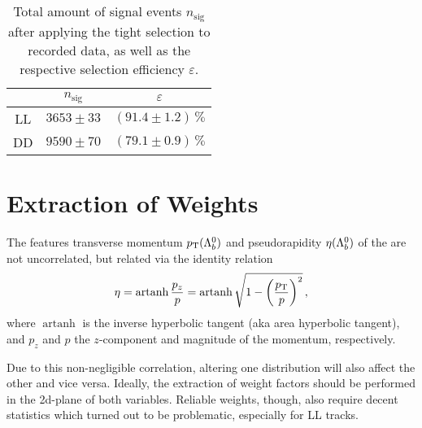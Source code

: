 \begin{table}[htbp]
    \centering
    \caption{Total amount of signal events $n_\text{sig}$ after applying the tight selection to recorded \decay{\Lb}{\jpsi\Lz} data, as well as the respective selection efficiency $\varepsilon$.}
    \label{tab:LbToJpsiLz_tighsel_eff}
    \begin{tabular}{ccc}
        \toprule
        & $n_\text{sig}$ & $\varepsilon$ \\
        \midrule
        \gls{LL} & $\num{3653} \pm 33$ & $(91.4 \pm 1.2) \,\%$ \\
        \gls{DD} & $\num{9590} \pm 70$ & $(79.1 \pm 0.9) \,\%$ \\
        \bottomrule
    \end{tabular}
\end{table}

\section{Extraction of Weights}
The features transverse momentum $\mbox{$p_{\mathrm{ T}}$}({{\Lambda}^0_{b}})$ and pseudorapidity $\eta({{\Lambda}^0_{b}})$ of the \Lb are not uncorrelated, but related via the identity relation
\begin{equation*}
    \eta = \operatorname{artanh} \frac{p_z}{p} = \operatorname{artanh} \sqrt{1 - \left( \frac{\mbox{$p_{\mathrm{ T}}$}}{p} \right)^2} \,,
\end{equation*}
where $\operatorname{artanh}$ is the inverse hyperbolic tangent (aka area hyperbolic tangent), and $p_z$ and $p$ the $z$-component and magnitude of the momentum, respectively.

%
Due to this non-negligible correlation, altering one distribution will also affect the other and vice versa.
Ideally, the extraction of weight factors should be performed in the 2d-plane of both variables.
Reliable weights, though, also require decent statistics which turned out to be problematic, especially for \gls{LL} tracks.


